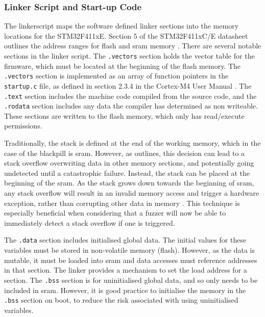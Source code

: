 \documentclass[../report.tex]{subfiles}
\begin{document}
\subsubsection{Linker Script and Start-up Code} \label{sec:linkerscript}

The linkerscript maps the software defined linker sections into the memory
locations for the STM32F411xE. Section 5 of the STM32F411xC/E datasheet
outlines the address ranges for flash and sram memory
\citep{stm32f4_datasheet}. There are several notable sections in the linker
script. The \lstinline|.vectors| section holds the vector table for the
firmware, which must be located at the beginning of the flash memory. The
\lstinline|.vectors| section is implemented as an array of function pointers in
the \lstinline|startup.c| file, as defined in section 2.3.4 in the Cortex-M4
User Manual \citep{armcm4_manual}. The \lstinline|.text| section includes the
machine code compiled from the source code, and the \lstinline|.rodata| section
includes any data the compiler has determined as non writeable. These sections
are written to the flash memory, which only has read/execute permissions.

Traditionally, the stack is defined at the end of the working memory, which in
the case of the blackpill is sram. However, as \citet{miro_stack} outlines,
this decision can lead to a stack overflow overwriting data in other memory
sections, and potentially going undetected until a catastrophic failure.
Instead, the stack can be placed at the beginning of the sram. As the stack
grows down towards the beginning of sram, any stack overflow will result in an
invalid memory access and trigger a hardware exception, rather than corrupting
other data in memory \citep{miro_stack}. This technique is especially
beneficial when considering that a fuzzer will now be able to immediately
detect a stack overflow if one is triggered.

The \lstinline|.data| section includes initialised global data. The initial
values for these variables must be stored in non-volatile memory (flash).
However, as the data is mutable, it must be loaded into sram and data accesses
must reference addresses in that section. The linker provides a mechanism to
set the load address for a section. The \lstinline|.bss| section is for
uninitialised global data, and so only needs to be included in sram. However,
it is good practice to initialise the memory in the \lstinline|.bss| section on
boot, to reduce the risk associated with using uninitialised variables.
\end{document}
